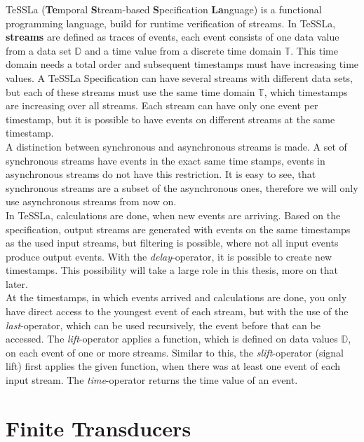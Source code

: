 TeSSLa (\textbf{Te}mporal \textbf{S}tream-based \textbf{S}pecification \textbf{La}nguage) is a functional programming language, build for runtime verification of streams. In TeSSLa, \textbf{streams} are defined as traces of events, each event consists of one data value from a data set $\mathbb D$ and a time value from a discrete time domain $\mathbb T$. This time domain needs a total order and subsequent timestamps must have increasing time values. A TeSSLa Specification can have several streams with different data sets, but each of these streams must use the same time domain $\mathbb T$, which timestamps are increasing over all streams. Each stream can have only one event per timestamp, but it is possible to have events on different streams at the same timestamp.\\
A distinction between synchronous and asynchronous streams is made. A set of synchronous streams have events in the exact same time stamps, events in asynchronous streams do not have this restriction. It is easy to see, that synchronous streams are a subset of the asynchronous ones, therefore we will only use asynchronous streams from now on.\\
In TeSSLa, calculations are done, when new events are arriving. Based on the specification, output streams are generated with events on the same timestamps as the used input streams, but filtering is possible, where not all input events produce output events. With the \emph{delay}-operator, it is possible to create new timestamps. This possibility will take a large role in this thesis, more on that later.\\
At the timestamps, in which events arrived and calculations are done, you only have direct access to the youngest event of each stream, but with the use of the \emph{last}-operator, which can be used recursively, the event before that can be accessed. The \emph{lift}-operator applies a function, which is defined on data values $\mathbb D$, on each event of one or more streams. Similar to this, the \emph{slift}-operator (signal lift) first applies the given function, when there was at least one event of each input stream. The \emph{time}-operator returns the time value of an event.\\


\section{Finite Transducers}

